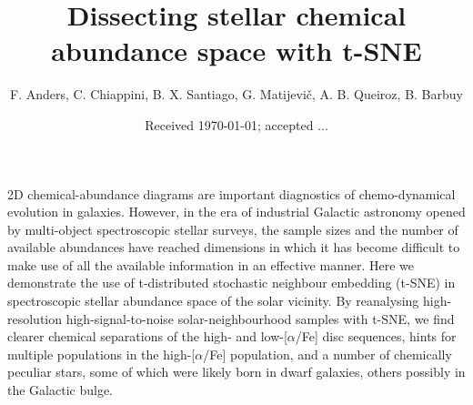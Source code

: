 \documentclass{aa}  %
\begin{document}
 

   \title{Dissecting stellar chemical abundance space with t-SNE}

   \author{F. Anders, C. Chiappini, B. X. Santiago, G. Matijevi\v{c}, A. B. Queiroz, B. Barbuy}
   
   

   \date{Received \today; accepted ...}

  \abstract
   {2D chemical-abundance diagrams are important diagnostics of chemo-dynamical evolution in galaxies. However, in the era of industrial Galactic astronomy opened by multi-object spectroscopic stellar surveys, the sample sizes and the number of available abundances have reached dimensions in which it has become difficult to make use of all the available information in an effective manner. Here we demonstrate the use of t-distributed stochastic neighbour embedding (t-SNE) in spectroscopic stellar abundance space of the solar vicinity. By reanalysing high-resolution high-signal-to-noise solar-neighbourhood samples with t-SNE, we find clearer chemical separations of the high- and low-[$\alpha$/Fe] disc sequences, hints for multiple populations in the high-[$\alpha$/Fe] population, and a number of chemically peculiar stars, some of which were likely born in dwarf galaxies, others possibly in the Galactic bulge.}

   \maketitle

\end{document}
